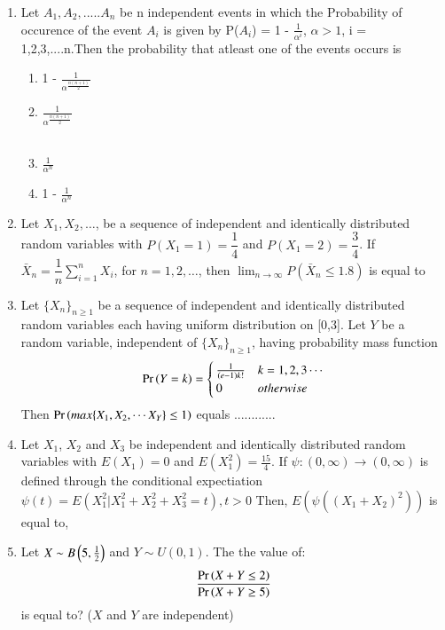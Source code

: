 \begin{enumerate}[label=\thesection.\arabic*.,ref=\thesection.\theenumi]
\item Let $A_{1},A_{2},.....A_{n}$ be n independent events in which the Probability of occurence of the event $A_{i}$ is given by P($A_{i}$) = 1 - $\frac{1}{\alpha^i}$, $\alpha >1$, i = 1,2,3,....n.Then the probability that atleast one of the events occurs is
\begin{enumerate}
    \item  1 - $\frac{1}{\alpha^\frac{n(n+1)}{2}}$ \hspace{0.95cm}
    \item  $\frac{1}{\alpha^\frac{n(n+1)}{2}}$\hspace{1.5cm}
    \\ \\
    \item  $\frac{1}{\alpha^n}$ \hspace{2.15cm}
    \item 1 - $\frac{1}{\alpha^n}$\hspace{0.95cm}
  \end{enumerate}
  \solution
  
  \item Let $X_{1},X_{2},\dots$, be a sequence of independent and identically distributed random variables with $P(X_{1}=1)=\dfrac{1}{4}$ and $P(X_{1}=2)=\dfrac{3}{4}$. If $\bar X_{n}=\dfrac{1}{n}\displaystyle\sum_{i=1}^{n}X_{i}$,  for $n=1,2,\dots$, then $\displaystyle\lim_{n\to\infty}P(\bar X_{n} \leq 1.8)$ is equal to
  \\
  \solution
  
  \item  Let $\{X_n\}_{n\ge 1}$ be a sequence of independent and identically distributed random variables each having uniform distribution on [0,3]. Let $Y$ be a random variable, independent of $\{X_n\}_{n\ge 1}$, having probability mass function
  \begin{align}
  \Pr\left(Y=k\right) = 
  \begin{cases}
  \frac{1}{(e-1)k!} & k=1,2,3\cdots \\
  0 & otherwise
  \end{cases}
  \end{align}
  Then $\Pr\left(max\{X_1,X_2,\cdots X_Y\}\le 1\right)$ equals ............\\
  \solution
    
%
\item Let $X_1$, $X_2$ and $X_3$ be independent and identically distributed random variables with $E(X_1) = 0$ and $E\left(X^2_1\right)=\frac{15}{4}$. If $\psi : (0,\infty) \rightarrow (0,\infty)$ is defined through the conditional expectiation
$\psi(t) = E\left(X^2_1 | X_1^2 + X_2^2 + X_3^2 = t\right), t>0$
Then, $E(\psi((X_1+X_2)^2))$ is equal to,
%
\\
\solution
  
%
\item Let $X \sim B\left(5,\frac{1}{2}\right)$ and $Y \sim U(0,1)$. The the value of:
\[
    \frac{\Pr\left(X+Y \leq 2\right)}{\Pr\left(X+Y \geq 5\right)}
\]
is equal to? ($X$ and $Y$ are independent)
\solution 
  


\end{enumerate}